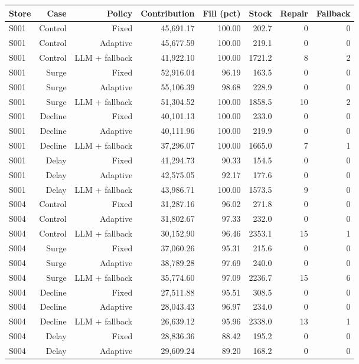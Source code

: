 \begin{tabular}{lrrrrrrr}
\toprule
Store & Case & Policy & Contribution & Fill (pct) & Stock & Repair & Fallback \\
\midrule
S001 & Control & Fixed & 45,691.17 & 100.00 & 202.7 & 0 & 0 \\
S001 & Control & Adaptive & 45,677.59 & 100.00 & 219.1 & 0 & 0 \\
S001 & Control & LLM + fallback & 41,922.10 & 100.00 & 1721.2 & 8 & 2 \\
S001 & Surge & Fixed & 52,916.04 & 96.19 & 163.5 & 0 & 0 \\
S001 & Surge & Adaptive & 55,106.39 & 98.68 & 228.9 & 0 & 0 \\
S001 & Surge & LLM + fallback & 51,304.52 & 100.00 & 1858.5 & 10 & 2 \\
S001 & Decline & Fixed & 40,101.13 & 100.00 & 233.0 & 0 & 0 \\
S001 & Decline & Adaptive & 40,111.96 & 100.00 & 219.9 & 0 & 0 \\
S001 & Decline & LLM + fallback & 37,296.07 & 100.00 & 1665.0 & 7 & 1 \\
S001 & Delay & Fixed & 41,294.73 & 90.33 & 154.5 & 0 & 0 \\
S001 & Delay & Adaptive & 42,575.05 & 92.17 & 177.6 & 0 & 0 \\
S001 & Delay & LLM + fallback & 43,986.71 & 100.00 & 1573.5 & 9 & 0 \\
S004 & Control & Fixed & 31,287.16 & 96.02 & 271.8 & 0 & 0 \\
S004 & Control & Adaptive & 31,802.67 & 97.33 & 232.0 & 0 & 0 \\
S004 & Control & LLM + fallback & 30,152.90 & 96.46 & 2353.1 & 15 & 1 \\
S004 & Surge & Fixed & 37,060.26 & 95.31 & 215.6 & 0 & 0 \\
S004 & Surge & Adaptive & 38,789.28 & 97.69 & 240.0 & 0 & 0 \\
S004 & Surge & LLM + fallback & 35,774.60 & 97.09 & 2236.7 & 15 & 6 \\
S004 & Decline & Fixed & 27,511.88 & 95.51 & 308.5 & 0 & 0 \\
S004 & Decline & Adaptive & 28,043.43 & 96.97 & 234.0 & 0 & 0 \\
S004 & Decline & LLM + fallback & 26,639.12 & 95.96 & 2338.0 & 13 & 1 \\
S004 & Delay & Fixed & 28,836.36 & 88.42 & 195.2 & 0 & 0 \\
S004 & Delay & Adaptive & 29,609.24 & 89.20 & 168.2 & 0 & 0 \\

\end{tabular}
